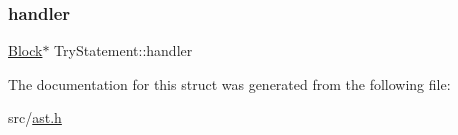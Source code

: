 \mbox{\label{struct_try_statement_a4d97ad90948102f8e6dca2051f03ceb0}} 
\subsubsection{\texorpdfstring{handler}{handler}}
{\footnotesize\ttfamily \hyperlink{struct_block}{Block}$\ast$ Try\+Statement\+::handler}



The documentation for this struct was generated from the following file\+:\begin{DoxyCompactItemize}
\item 
src/\hyperlink{ast_8h}{ast.\+h}\end{DoxyCompactItemize}
